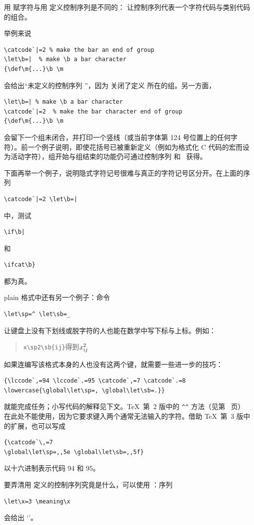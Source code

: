 \documentclass[a4paper]{rapport3}
\newenvironment{disp}{\begin{quotation}}{\end{quotation}}
\begin{document}
用  赋字符与用  定义控制序列是不同的： 让控制序列代表一个字符代码与类别代码的组合。

举例来说
\begin{verbatim}
\catcode`|=2 % make the bar an end of group
\let\b=|  % make \b a bar character
{\def\m{...}\b \m
\end{verbatim}
会给出“未定义的控制序列 ”，因为  关闭了定义  所在的组。另一方面，
\begin{verbatim}
\let\b=| % make \b a bar character
\catcode`|=2  % make the bar character end of group
{\def\m{...}\b \m
\end{verbatim}
会留下一个组未闭合，并打印一个竖线（或当前字体第 124 号位置上的任何字符）。前一个例子说明，即使花括号已被重新定义（例如为格式化 C 代码的宏而设为活动字符），组开始与组结束的功能仍可通过控制序列  和~ 获得。

下面再举一个例子，说明隐式字符记号很难与真正的字符记号区分开。在上面的序列
\begin{verbatim}
\catcode`|=2 \let\b=|
\end{verbatim}
中，测试
\begin{verbatim}
\if\b|
\end{verbatim}
和
\begin{verbatim}
\ifcat\b}
\end{verbatim}
都为真。

plain 格式中还有另一个例子：命令
\begin{verbatim}
\let\sp=^ \let\sb=_ 
\end{verbatim}
让键盘上没有下划线或脱字符的人也能在数学中写下标与上标。例如：
\begin{disp}\verb>x\sp2\sb{ij}>\quad 得到\quad $x\sp2\sb{ij}$\end{disp}
如果连编写该格式本身的人也没有这两个键，就需要一些进一步的技巧：\label{spsb:truc}
\begin{verbatim}
{\lccode`,=94 \lccode`.=95 \catcode`,=7 \catcode`.=8
\lowercase{\global\let\sp=, \global\let\sb=.}}
\end{verbatim}
就能完成任务；小写代码的解释见下文。\TeX\ 第~2 版中的 \verb>^^> 方法（见第~\pageref{hathat} 页）在此处不能使用，因为它要求键入两个通常无法输入的字符。借助 \TeX\ 第~3 版中的扩展，也可以写成
\begin{verbatim}
{\catcode`\,=7
\global\let\sp=,,5e \global\let\sb=,,5f}
\end{verbatim}
以十六进制表示代码 94 和 95。

要弄清用  定义的控制序列究竟是什么，可以使用 ：序列
\begin{verbatim}
\let\x=3 \meaning\x
\end{verbatim}
会给出 `'。\awp
\end{document}
